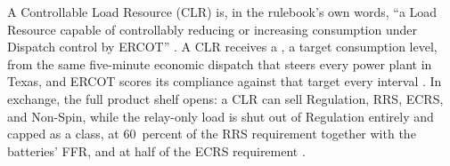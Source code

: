 A Controllable Load Resource (CLR) is, in the rulebook's own words, ``a Load Resource capable of controllably reducing or increasing consumption under Dispatch control by ERCOT'' \autocite{ercot2026protocols}. %
A CLR receives a , a target consumption level, from the same five-minute economic dispatch that steers every power plant in Texas, and ERCOT scores its compliance against that target every interval \autocite{ercot2026protocols}. %
In exchange, the full product shelf opens: a CLR can sell Regulation, RRS, ECRS, and Non-Spin, while the relay-only load is shut out of Regulation entirely and capped as a class, at 60~percent of the RRS requirement together with the batteries' FFR, and at half of the ECRS requirement \autocite{ercot2026protocols}. %

